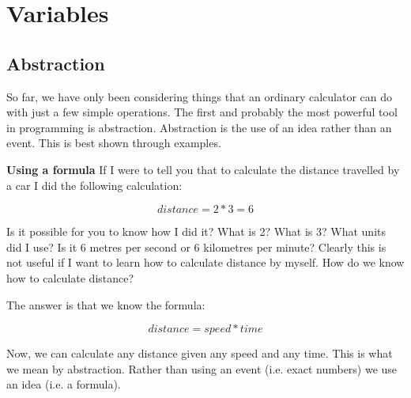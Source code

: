 
\chapter{Variables}

\section{Abstraction}

So far, we have only been considering things that an ordinary calculator can do with just a few simple
operations. The first and probably the most powerful tool in programming is abstraction. Abstraction
is the use of an idea rather than an event. This is best shown through examples.

\begin{example} \textbf{Using a formula}
If I were to tell you that to calculate the distance travelled by a car I did the following calculation:

\[ distance = 2 * 3 = 6 \]

Is it possible for you to know how I did it? What is 2? What is 3? What units did I use? Is it 6 metres
per second or 6 kilometres per minute? Clearly this is not useful if I want to learn how to calculate
distance by myself. How do we know how to calculate distance? 

The answer is that we know the formula:

\[ distance = speed * time \]

Now, we can calculate any distance given any speed and any time. This is what we mean by
abstraction. Rather than using an event (i.e. exact numbers) we use an idea (i.e. a formula).
\end{example}

